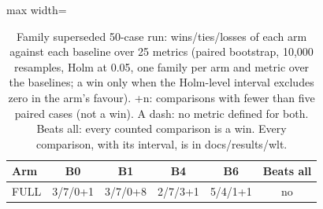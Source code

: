\begin{table}[!t]
\centering\small
\begin{adjustbox}{max width=\textwidth}
\begin{tabular}{@{}lccccc@{}}
\toprule
Arm & B0 & B1 & B4 & B6 & Beats all \\
\midrule
FULL & 3/7/0+1 & 3/7/0+8 & 2/7/3+1 & 5/4/1+1 & no \\
\bottomrule
\end{tabular}
\end{adjustbox}
\caption{Family superseded 50-case run: wins/ties/losses of each arm against each baseline over 25 metrics (paired bootstrap, 10,000 resamples, Holm at 0.05, one family per arm and metric over the baselines; a win only when the Holm-level interval excludes zero in the arm's favour). +n: comparisons with fewer than five paired cases (not a win). A dash: no metric defined for both. Beats all: every counted comparison is a win. Every comparison, with its interval, is in docs/results/wlt.}
\label{tab:wlt_v1}
\end{table}
